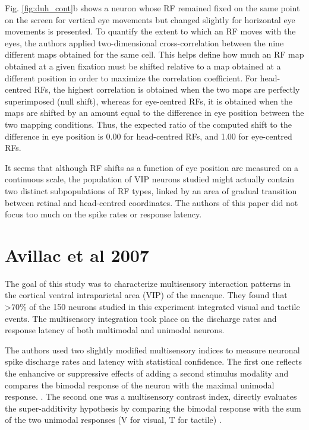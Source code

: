 \documentclass[10pt,oneside,final]{article}
\begin{document}
        Fig. \ref{fig:duh_cont}b shows a neuron whose RF remained fixed on the same point on the screen for vertical eye movements but changed slightly for horizontal eye movements is presented. To quantify the extent to which an RF moves with the eyes, the authors applied two-dimensional cross-correlation between the nine different maps obtained for the same cell. This helps define how much an RF map obtained at a given fixation must be shifted relative to a map obtained at a different position in order to maximize the correlation coefficient. For head-centred RFs, the highest correlation is obtained when the two maps are perfectly superimposed (null shift), whereas for eye-centred RFs, it is obtained when the maps are shifted by an amount equal to the difference in eye position between the two mapping conditions. Thus, the expected ratio of the computed shift to the difference in eye position is 0.00 for head-centred RFs, and 1.00 for eye-centred RFs. 

        It seems that although RF shifts as a function of eye position are measured on a continuous scale, the population of VIP neurons studied might actually contain two distinct subpopulations of RF types, linked by an area of gradual transition between retinal and head-centred coordinates. The authors of this paper did not focus too much on the spike rates or response latency.
    \section{Avillac et al 2007}
        The goal of this study was to characterize multisensory interaction patterns in the cortical ventral intraparietal area (VIP) of the macaque. They found that \textgreater70\% of the 150 neurons studied in this experiment integrated visual and tactile events. The multisensory integration took place on the discharge rates and response latency of both multimodal and unimodal neurons. 

        The authors used two slightly modified multisensory indices to measure neuronal spike discharge rates and latency with statistical confidence. The first one reflects the enhancive or suppressive effects of adding a second stimulus modality and compares the bimodal response of the neuron with the maximal unimodal response. \cite{meredith1983interactions}. The second one was a multisensory contrast index, directly evaluates the super-additivity hypothesis by comparing the bimodal response with the sum of the two unimodal responses (V for visual, T for tactile) \cite{laurienti2005use}. 
        
\end{document}
